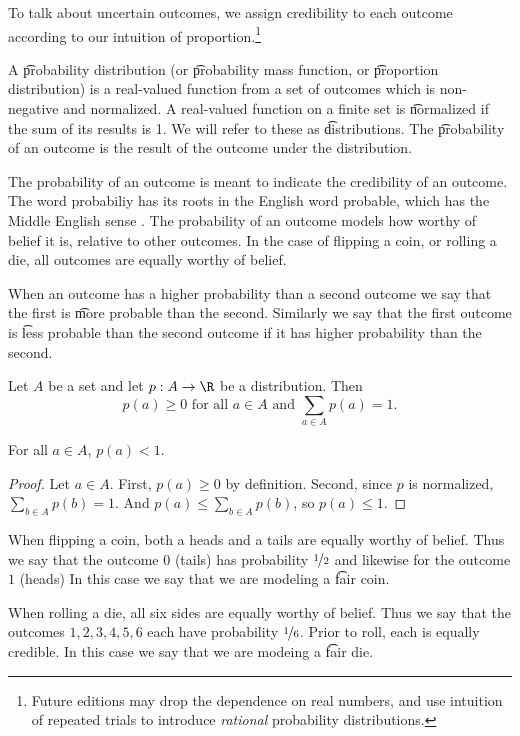

To talk about uncertain outcomes, we assign credibility to each outcome according to our intuition of proportion.\footnote{Future editions may drop the dependence on real numbers, and use intuition of repeated trials to introduce \textit{rational} probability distributions.}


A \t{probability distribution} (or \t{probability mass function}, or \t{proportion distribution}) is a real-valued function from a set of outcomes which is non-negative and normalized.
A real-valued function on a finite set is \t{normalized} if the sum of its results is 1.
We will refer to these as \t{distributions}.
The \t{probability of an outcome} is the result of the outcome under the distribution.

The probability of an outcome is meant to indicate the credibility of an outcome.
The word probabiliy has its roots in the English word probable, which has the Middle English sense .
The probability of an outcome models how worthy of belief it is, relative to other outcomes.
In the case of flipping a coin, or rolling a die, all outcomes are equally worthy of belief.

When an outcome has a higher probability than a second outcome we say that the first is \t{more probable} than the second.
Similarly we say that the first outcome is \t{less probable} than the second outcome if it has higher probability than the second.


Let $A$ be a set and let $p: A \to \R$ be a distribution.
Then
\[
  p(a) \geq 0 \text{ for all } a \in A \text{ and } \sum_{a \in A} p(a) = 1.
\]

\begin{prop}
  For all $a \in A$, $p(a) < 1$.%
\begin{proof}

Let $a \in A$.
First, $p(a) \geq 0$ by definition.
Second, since $p$ is normalized, $\sum_{b \in A} p(b) = 1$.
And $p(a) \leq \sum_{b \in A} p(b)$, so $p(a) \leq 1$.

\end{proof}

\end{prop}

When flipping a coin, both a heads and a tails are equally worthy of belief.
Thus we say that the outcome $0$ (tails) has probability $\nicefrac{1}{2}$ and likewise for the outcome $1$ (heads)
In this case we say that we are modeling a \t{fair coin}.

When rolling a die, all six sides are equally worthy of belief.
Thus we say that the outcomes $1, 2, 3, 4, 5, 6$ each have probability $\nicefrac{1}{6}$.
Prior to roll, each is equally credible.
In this case we say that we are modeing a \t{fair die}.
